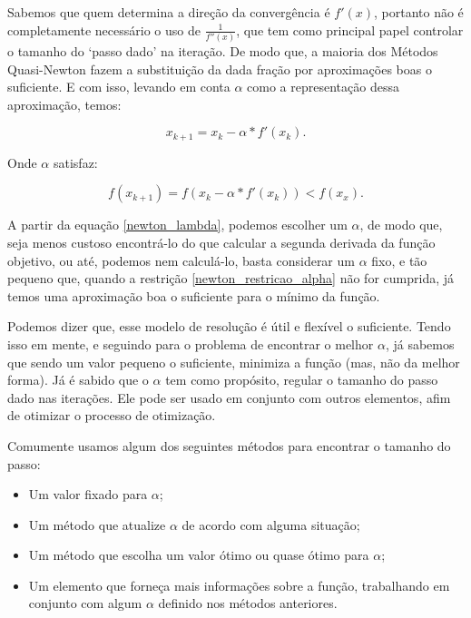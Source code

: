 Sabemos que quem determina a direção da convergência é \(f'(x)\), portanto
não é completamente necessário o uso de \( \frac{1}{f''(x)} \), que
tem como principal papel controlar o tamanho do `passo dado' na iteração.
De modo que, a maioria dos Métodos Quasi-Newton fazem a substituição
da dada fração por aproximações boas o suficiente. E com isso, levando em
conta $\alpha$ como a representação dessa aproximação, temos:

\begin{equation}
    x_{k+1} = x_{k} -  \alpha * f'(x_{k}).
    \label{newton_lambda}
\end{equation}

Onde \(\alpha\) satisfaz:

\begin{equation}
    f(x_{k+1}) = f(x_{k} -  \alpha * f'(x_{k})) < f(x_{x}).
    \label{newton_restricao_alpha}
\end{equation}

A partir da equação \ref{newton_lambda}, podemos escolher um \(\alpha\), de
modo que, seja menos custoso encontrá-lo do que calcular a segunda derivada
da função objetivo, ou até, podemos nem calculá-lo, basta considerar
um \(\alpha\) fixo, e tão pequeno que, quando a restrição
\ref{newton_restricao_alpha} não for cumprida, já temos uma aproximação boa o
suficiente para o mínimo da função.

Podemos dizer que, esse modelo de resolução é útil e flexível o
suficiente. Tendo isso em mente, e seguindo para o problema de encontrar
o melhor \(\alpha\), já sabemos que sendo um valor pequeno o
suficiente, minimiza a função (mas, não da melhor forma). Já é sabido
que o \(\alpha\) tem como propósito, regular o tamanho do passo dado nas
iterações. Ele pode ser usado em conjunto com outros elementos, afim de
otimizar o processo de otimização.

Comumente usamos algum dos seguintes métodos para encontrar o tamanho do
passo:

    \begin{itemize}
            \item Um valor fixado para \(\alpha\);
            \item Um método que atualize \(\alpha\) de acordo com alguma
                situação;
            \item Um método que escolha um valor ótimo ou quase ótimo para
                \(\alpha\);
            \item Um elemento que forneça mais informações sobre a função,
                trabalhando em conjunto com algum \(\alpha\) definido nos
                métodos anteriores.
    \end{itemize}


